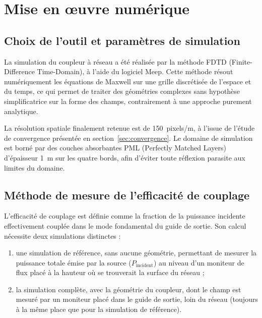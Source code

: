 \documentclass[a4paper,11pt]{report}
\begin{document}
\chapter{Mise en œuvre numérique}
\label{ch:numerique}

\section{Choix de l'outil et paramètres de simulation}

La simulation du coupleur à réseau a été réalisée par la méthode FDTD (Finite-Difference Time-Domain), à l'aide du logiciel Meep. Cette méthode résout numériquement les équations de Maxwell sur une grille discrétisée de l'espace et du temps, ce qui permet de traiter des géométries complexes sans hypothèse simplificatrice sur la forme des champs, contrairement à une approche purement analytique.

La résolution spatiale finalement retenue est de 150~pixels/\textmu m, à l'issue de l'étude de convergence présentée en section~\ref{sec:convergence}. Le domaine de simulation est borné par des couches absorbantes PML (Perfectly Matched Layers) d'épaisseur 1~\textmu m sur les quatre bords, afin d'éviter toute réflexion parasite aux limites du domaine.

\section{Méthode de mesure de l'efficacité de couplage}

L'efficacité de couplage est définie comme la fraction de la puissance incidente effectivement couplée dans le mode fondamental du guide de sortie. Son calcul nécessite deux simulations distinctes :

\begin{enumerate}
    \item une simulation de référence, sans aucune géométrie, permettant de mesurer la puissance totale émise par la source ($P_{\text{incident}}$) au niveau d'un moniteur de flux placé à la hauteur où se trouverait la surface du réseau ;
    \item la simulation complète, avec la géométrie du coupleur, dont le champ est mesuré par un moniteur placé dans le guide de sortie, loin du réseau (toujours à la même place que pour la simulation de référence).
\end{enumerate}
\end{document}
